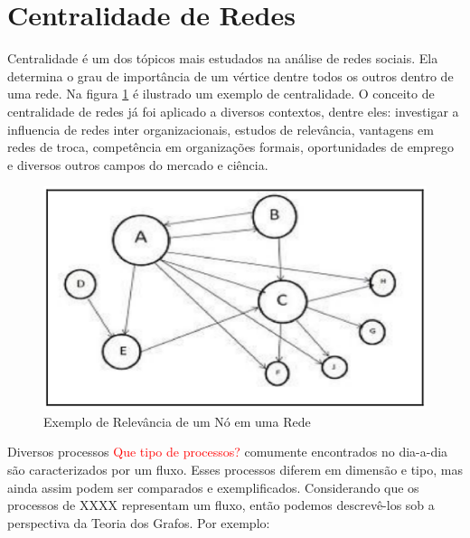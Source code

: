 \section{Centralidade de Redes}
\label{ref:cen}
Centralidade é um dos tópicos mais estudados na análise de redes sociais. Ela determina o grau de importância de um vértice dentre todos os outros dentro de uma rede. Na figura \ref{fig:centrality} é ilustrado um exemplo de centralidade. 
O conceito de centralidade de redes já foi aplicado a diversos contextos, dentre eles: investigar a influencia de redes inter organizacionais, estudos de relevância, vantagens em redes de troca, competência em organizações formais, oportunidades de emprego e diversos outros campos 
do mercado e ciência\cite{centrality}.


\begin{figure}[!h]
    \centering
        \includegraphics[keepaspectratio=true,scale=0.5]{figuras/centrality.eps}
    \caption{Exemplo de Relevância de um Nó em uma Rede}
    \label{fig:centrality}
\end{figure}

Diversos processos \textcolor{red}{Que tipo de processos?} comumente encontrados no dia-a-dia são caracterizados por um fluxo. Esses processos diferem em dimensão e tipo, mas ainda assim podem ser comparados e exemplificados. Considerando que os processos de XXXX representam um fluxo, então podemos descrevê-los sob a perspectiva da Teoria dos Grafos\cite{ceflow}. Por exemplo:


